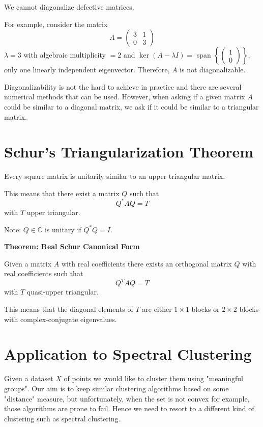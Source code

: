 We cannot diagonalize defective matrices.

For example, consider the matrix
\[
A = \begin{pmatrix}
3 & 1 \\
0 & 3 
\end{pmatrix}
\]
\( \lambda = 3 \) with algebraic multiplicity \( = 2 \) and \( \ker(A - \lambda I) = \) span \( \left\{ \begin{pmatrix} 1 \\ 0 \end{pmatrix} \right\} \), only one linearly independent eigenvector. Therefore, \( A \) is not diagonalizable.

Diagonalizability is not the hard to achieve in practice and there are several numerical methods that can be used. However, when asking if a given matrix \( A \) could be similar to a diagonal matrix, we ask if it could be similar to a triangular matrix.



\section*{Schur's Triangularization Theorem}

Every square matrix is unitarily similar to an upper triangular matrix.

This means that there exist a matrix \( Q \) such that 
\[ Q^*AQ = T \]
with \( T \) upper triangular.

Note: \( Q \in \mathbb{C} \) is unitary if \( Q^*Q = I \).

\textbf{Theorem: Real Schur Canonical Form}

Given a matrix \( A \) with real coefficients there exists an orthogonal matrix \( Q \) with real coefficients such that
\[ Q^T AQ = T \]
with \( T \) quasi-upper triangular.

This means that the diagonal elements of \( T \) are either \( 1 \times 1 \) blocks or \( 2 \times 2 \) blocks with complex-conjugate eigenvalues.

\section{Application to Spectral Clustering}

Given a dataset \( X \) of points we would like to cluster them using "meaningful groups". Our aim is to keep similar clustering algorithms based on some "distance" measure, but unfortunately, when the set is not convex for example, those algorithms are prone to fail. Hence we need to resort to a different kind of clustering such as spectral clustering.

